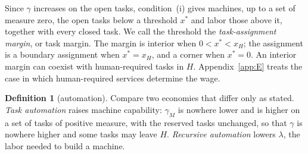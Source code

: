 \documentclass[12pt]{article}
\theoremstyle{plain}
\theoremstyle{definition}
\newtheorem{definition}{Definition}
\theoremstyle{remark}
\begin{document}
Since $\gamma$ increases on the open tasks, condition~(i) gives machines, up to a set of measure zero, the open tasks below a threshold $x^*$ and labor those above it, together with every closed task.
We call the threshold the \emph{task-assignment margin}, or task margin.
The margin is interior when $0<x^*<x_H$; the assignment is a boundary assignment when $x^*=x_H$, and a corner when $x^*=0$.
An interior margin can coexist with human-required tasks in $H$. Appendix~\ref{app:E} treats the case in which human-required services determine the wage.

\begin{definition}[automation]\label{def:automation}
Compare two economies that differ only as stated. \emph{Task automation} raises machine capability: $\gamma_M$ is nowhere lower and is higher on a set of tasks of positive measure, with the reserved tasks unchanged, so that $\gamma$ is nowhere higher and some tasks may leave $H$. \emph{Recursive automation} lowers $\lambda$, the labor needed to build a machine.
\end{definition}
\end{document}
